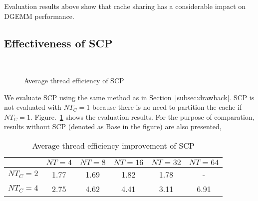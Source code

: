 Evaluation results above show that cache sharing has a considerable
impact on DGEMM performance. 

\subsection{Effectiveness of SCP}\label{subsec:benefit}

\begin{figure}
  \centering
  \\
  \caption{Average thread efficiency of SCP}
  \label{fig:benefit}
\end{figure}

We evaluate SCP using the same method as in Section~\ref{subsec:drawback}.
SCP is not evaluated with $NT_C=1$ because there is no need
to partition the cache if $NT_C=1$.
Figure.~\ref{fig:benefit} shows the evaluation results.
For the purpose of comparation, results without SCP
(denoted as Base in the figure) are also presented,

\begin{table}
  \centering
  \caption{Average thread efficiency improvement of SCP}
  \label{tab:win}
  \setlength{\tabcolsep}{3.5pt}
  \begin{tabular}{cccccc}
    \toprule
     & $NT=4$ & $NT=8$ & $NT=16$ & $NT=32$ & $NT=64$ \\
    \midrule
    $NT_C=2$ & 1.77 & 1.69 & 1.82 & 1.78 & - \\
    $NT_C=4$ & 2.75 & 4.62 & 4.41 & 3.11 & 6.91 \\
    \bottomrule
  \end{tabular}
\end{table}


